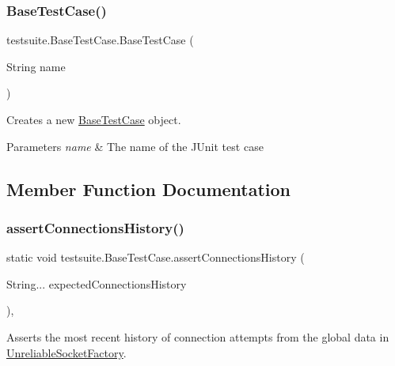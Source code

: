 \subsubsection{\texorpdfstring{Base\+Test\+Case()}{BaseTestCase()}}
{\footnotesize\ttfamily testsuite.\+Base\+Test\+Case.\+Base\+Test\+Case (\begin{DoxyParamCaption}\item[{String}]{name }\end{DoxyParamCaption})}

Creates a new \mbox{\hyperlink{classtestsuite_1_1_base_test_case}{Base\+Test\+Case}} object.


\begin{DoxyParams}{Parameters}
{\em name} & The name of the J\+Unit test case \\
\hline
\end{DoxyParams}


\subsection{Member Function Documentation}
\mbox{\label{classtestsuite_1_1_base_test_case_aca5533ef294301b97ad9d54a7edf825f}} 
\subsubsection{\texorpdfstring{assert\+Connections\+History()}{assertConnectionsHistory()}}
{\footnotesize\ttfamily static void testsuite.\+Base\+Test\+Case.\+assert\+Connections\+History (\begin{DoxyParamCaption}\item[{String...}]{expected\+Connections\+History }\end{DoxyParamCaption})\hspace{0.3cm}{\ttfamily [static]}, {\ttfamily [protected]}}

Asserts the most recent history of connection attempts from the global data in \mbox{\hyperlink{classtestsuite_1_1_unreliable_socket_factory}{Unreliable\+Socket\+Factory}}.



